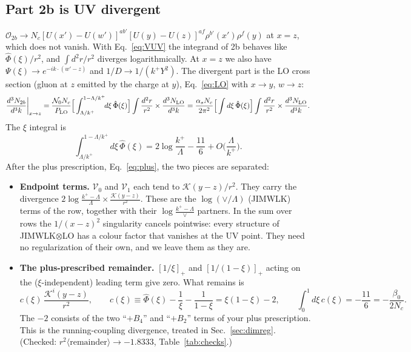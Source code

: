 \documentclass[10pt]{article}
\numberwithin{equation}{section}
\newcommand{\KK}{\mathcal K}
\newcommand{\Nz}{\mathcal N_0}
\newcommand{\Ph}{\hat\Phi}
\newcommand{\OO}{\mathcal O}
\newcommand{\VV}{\mathcal V}
\begin{document}
\subsection{Part 2b is UV divergent}\label{sec:2b}
$\OO_{2b}\to N_c[U(x')-U(w')]^{ab'}[U(y)-U(z)]^{af}\rho^{b'}(x')\rho^f(y)$ at $x=z$, which does not vanish. With Eq.~\eqref{eq:VUV} the integrand of 2b behaves like $\Ph(\xi)/r^2$, and $\int d^2r/r^2$ diverges logarithmically. At $x=z$ we also have $\Psi(\xi)\to e^{-ik\cdot(w'-z)}$ and $1/D\to1/(k^+Y^2)$. The divergent part is the LO cross section (gluon at $z$ emitted by the charge at $y$), Eq.~\eqref{eq:LO} with $x\to y$, $w\to z$:
\begin{equation}
\frac{d^3N_{2b}}{d^3k}\bigg|_{x\to z}=\frac{\Nz N_c}{P_{\rm LO}}\Big[\int_{\Lambda/k^+}^{1-\Lambda/k^+}\!\!d\xi\,\Ph(\xi)\Big]\int\frac{d^2r}{r^2}\times\frac{d^3N_{\rm LO}}{d^3k}=\frac{\alpha_sN_c}{2\pi^2}\Big[\int d\xi\,\Ph(\xi)\Big]\int\frac{d^2r}{r^2}\times\frac{d^3N_{\rm LO}}{d^3k}.
\end{equation}
The $\xi$ integral is
\begin{equation}
\int_{\Lambda/k^+}^{1-\Lambda/k^+}d\xi\,\Ph(\xi)=2\log\frac{k^+}{\Lambda}-\frac{11}{6}+O\Big(\frac{\Lambda}{k^+}\Big).
\end{equation}
After the plus prescription, Eq.~\eqref{eq:plus}, the two pieces are separated:
\begin{itemize}
\item \textbf{Endpoint terms.} $\VV_0$ and $\VV_1$ each tend to $\KK(y-z)/r^2$. They carry the divergence $2\log\frac{k^+-\Lambda}{\Lambda}\times\frac{\KK(y-z)}{r^2}$. These are the $\log(\vee/\Lambda)$ (JIMWLK) terms of the row, together with their $\log\frac{k^+-\Lambda}{\vee}$ partners. In the sum over rows the $1/(x-z)^2$ singularity cancels pointwise: every structure of JIMWLK$\otimes$LO has a colour factor that vanishes at the UV point. They need no regularization of their own, and we leave them as they are.
\item \textbf{The plus-prescribed remainder.} $[1/\xi]_+$ and $[1/(1-\xi)]_+$ acting on the ($\xi$-independent) leading term give zero. What remains is
\begin{equation}
c(\xi)\,\frac{\KK^i(y-z)}{r^2},\qquad c(\xi)\equiv\Ph(\xi)-\frac1\xi-\frac{1}{1-\xi}=\xi(1-\xi)-2,\qquad \int_0^1d\xi\,c(\xi)=-\frac{11}{6}=-\frac{\beta_0}{2N_c}.
\label{eq:c}
\end{equation}
The $-2$ consists of the two ``$+B_4$'' and ``$+B_2$'' terms of your plus prescription. This is the running-coupling divergence, treated in Sec.~\ref{sec:dimreg}. (Checked: $r^2\langle\text{remainder}\rangle\to-1.8333$, Table~\ref{tab:checks}.)
\end{itemize}
\end{document}
